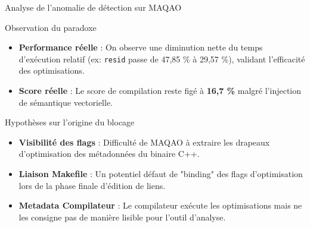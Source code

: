 \begin{frame}{Analyse de l'anomalie de détection sur MAQAO}
    \begin{block}{Observation du paradoxe}
        \fontsize{8}{9}\selectfont
        \begin{itemize}
            \item \textbf{Performance réelle} : On observe une diminution nette du temps d'exécution relatif (ex: \texttt{resid} passe de 47,85 \% à 29,57 \%), validant l'efficacité des optimisations.
            \item \textbf{Score réelle} : Le score de compilation reste figé à \textbf{16,7 \%} malgré l'injection de sémantique vectorielle.
        \end{itemize}
    \end{block}

    \begin{block}{Hypothèses sur l'origine du blocage}
        \fontsize{8}{9}\selectfont
        \begin{itemize}
            \item \textbf{Visibilité des flags} : Difficulté de MAQAO à extraire les drapeaux d'optimisation des métadonnées du binaire C++.
            \item \textbf{Liaison Makefile} : Un potentiel défaut de "binding" des flags d'optimisation lors de la phase finale d'édition de liens.
            \item \textbf{Metadata Compilateur} : Le compilateur exécute les optimisations mais ne les consigne pas de manière lisible pour l'outil d'analyse.
        \end{itemize}
    \end{block}
\end{frame}